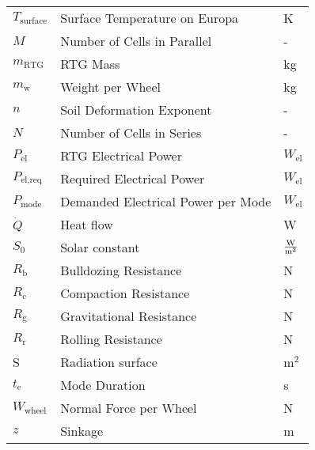 \begin{longtable}[l]{lll}
\(T_\text{surface}\)	&	Surface Temperature on Europa				&	K							\\
$M$						&	Number of Cells in Parallel					& -								\\
$m_\text{RTG}$			&	RTG Mass									& kg							\\
\(m_\text{w}\)			&	Weight per Wheel							& kg							\\
\(n\)					&	Soil Deformation Exponent					& -								\\
$N$						&	Number of Cells in Series					& -								\\
$P_\text{el}$			&	RTG Electrical Power						& $W_\text{el}$					\\
$P_\text{el,req}$		&	Required Electrical Power					& $W_\text{el}$					\\
$P_\text{mode}$			&	Demanded Electrical Power per Mode			& $W_\text{el}$					\\
$\dot{Q}$				&	Heat flow									& W								\\
	$S_0$					&	Solar constant 							& $\frac{{\rm W}}{{\rm m}^2}$				\\
\(R_\text{b}\)			&	Bulldozing Resistance						& N								\\
\(R_\text{c}\)			&	Compaction Resistance						& N								\\
\(R_\text{g}\)			&	Gravitational Resistance					& N								\\
\(R_\text{r}\)			&	Rolling Resistance							& N								\\
S						&	Radiation surface							& m$^2$							\\
$t_\text{e}$			&	Mode Duration								& s								\\
\(W_\text{wheel}\)		&	Normal Force per Wheel						& N								\\
\(z\)					&	Sinkage										& m								\\




\end{longtable}
